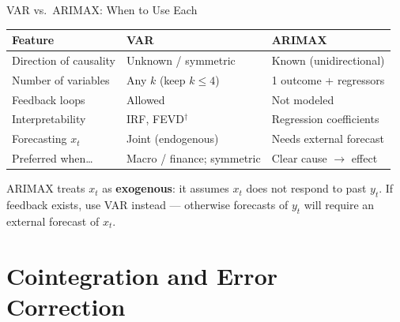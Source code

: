 \documentclass[aspectratio=169, 11pt]{beamer}
\begin{document}
\begin{frame}{VAR vs.\ ARIMAX: When to Use Each}
  \begin{center}
    {\small
    \begin{tabular}{lll}
      \toprule
      \textbf{Feature} & \textbf{VAR} & \textbf{ARIMAX} \\
      \midrule
      Direction of causality & Unknown / symmetric & Known (unidirectional) \\
      Number of variables    & Any $k$ (keep $k\leq 4$) & 1 outcome + regressors \\
      Feedback loops         & Allowed                   & Not modeled \\
      Interpretability       & IRF, FEVD$^\dagger$       & Regression coefficients \\
      Forecasting $x_t$      & Joint (endogenous)        & Needs external forecast \\
      \midrule
      Preferred when\ldots   & Macro / finance; symmetric & Clear cause $\to$ effect \\
      \bottomrule
    \end{tabular}
    }
  \end{center}
  \begin{warningbox}
    ARIMAX treats $x_t$ as \textbf{exogenous}: it assumes $x_t$ does not
    respond to past $y_t$. If feedback exists, use VAR instead --- otherwise
    forecasts of $y_t$ will require an external forecast of $x_t$.
  \end{warningbox}
\end{frame}

\section{Cointegration and Error Correction}

\end{document}
